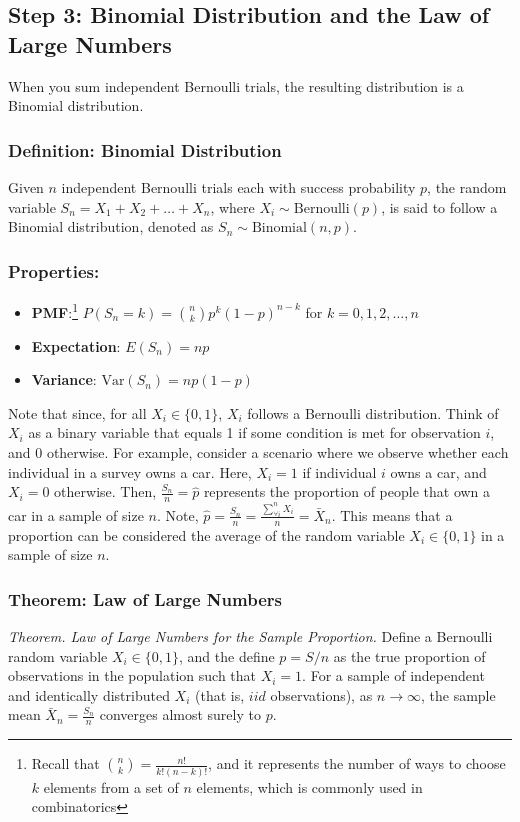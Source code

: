 \documentclass[11pt]{article}
\begin{document}
\subsection*{Step 3: Binomial Distribution and the Law of Large Numbers}

When you sum independent Bernoulli trials, the resulting distribution is a Binomial distribution.

\subsubsection*{Definition: Binomial Distribution}
Given \(n\) independent Bernoulli trials each with success probability \(p\), the random variable \(S_n = X_1 + X_2 + \ldots + X_n\), where \(X_i \sim \text{Bernoulli}(p)\), is said to follow a Binomial distribution, denoted as \(S_n \sim \text{Binomial}(n, p)\).

\subsubsection*{Properties:}
\begin{itemize}
\item  \textbf{PMF}:\footnote{Recall that $\binom{n}{k} = \frac{n!}{k! (n-k)!}$, and it represents the number of ways to choose $k$ elements from a set of $n$ elements, which is commonly used in combinatorics} \(P(S_n = k) = \binom{n}{k} p^k (1-p)^{n-k}\) for \(k = 0, 1, 2, \ldots, n\)
\item \textbf{Expectation}: \(E(S_n) = np\)
\item \textbf{Variance}: \(\text{Var}(S_n) = np(1-p)\)
\end{itemize}

Note that since, for all \( X_i \in \{0, 1\} \), \( X_i \) follows a Bernoulli distribution. Think of \( X_i \) as a binary variable that equals 1 if some condition is met for observation \( i \), and 0 otherwise. For example, consider a scenario where we observe whether each individual in a survey owns a car. Here, \( X_i = 1 \) if individual \( i \) owns a car, and \( X_i = 0 \) otherwise.  Then, $\frac{S_n}{n} = \hat{p}$ represents the proportion of people that own a car in a sample of size $n$. Note, $\hat{p} =\frac{S_n}{n}= \frac{\sum_{\forall i}^{n}{X_i}}{n} =  \bar{X}_n $. This means that a proportion can be considered the average of the random variable $X_i  \in \{0, 1\} $ in a sample of size $n$. 


\subsubsection*{Theorem: Law of Large Numbers}
\emph{Theorem. Law of Large Numbers for the Sample Proportion.} Define a Bernoulli random variable \( X_i \in \{0, 1\} \), and the define \(p = S / n\) as the true proportion of observations in the population such that $X_i=1$. For a sample of independent and identically distributed $X_i$ (that is, $iid$ observations), as \(n \rightarrow \infty\), the sample mean \(\bar{X}_n = \frac{S_n}{n}\) converges almost surely to \(p\). \newline  
\end{document}
